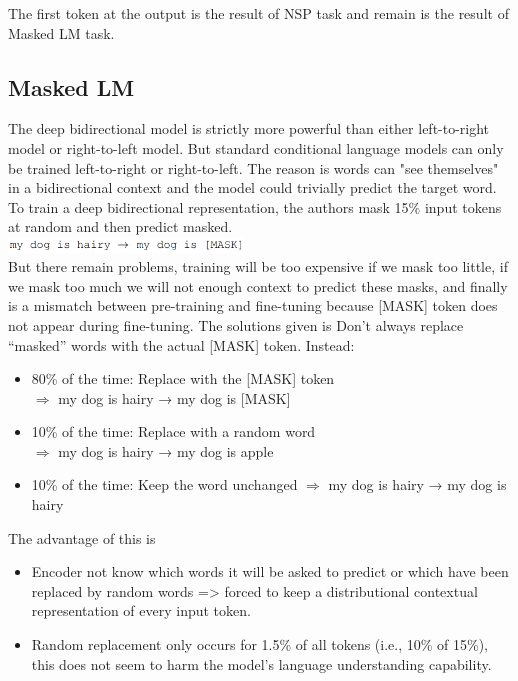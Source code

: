 \documentclass[11pt]{article}
\begin{document}
The first token at the output is the result of NSP task and remain is the result of Masked LM task.
\subsection{Masked LM}
\quad The deep bidirectional model is strictly more powerful than either left-to-right model or right-to-left model. But standard conditional language models can only be trained left-to-right or right-to-left. The reason is words can "see themselves" in a bidirectional context and the model could trivially predict the target word. To train a deep bidirectional representation, the authors mask 15$\%$ input tokens at random and then predict masked. \\

\includegraphics[width=0.47\textwidth]{MLM.png} \\

But there remain problems, training will be too expensive if we mask too little, if we mask too much we will not enough context to predict these masks, and finally is a mismatch between pre-training and fine-tuning because [MASK] token does not appear during fine-tuning. The solutions given is Don't always replace “masked” words with the actual [MASK] token. Instead: 
\begin{itemize}
 \item 80\% of the time: Replace with the [MASK] token\\
$\Rightarrow$ my dog is hairy → my dog is [MASK] 

 \item 10\% of the time: Replace with a random word\\
$\Rightarrow$ my dog is hairy → my dog is apple 

 \item 10\% of the time: Keep the word unchanged
$\Rightarrow$ my dog is hairy → my dog is hairy   
\end{itemize}

The advantage of this is
\begin{itemize}
    \item Encoder not know which words it will be asked to predict or which have been replaced by random words => forced to keep a distributional contextual representation of every input token.
    \item Random replacement only occurs for 1.5\% of all tokens (i.e., 10\% of 15\%), this does not seem to harm the model’s language understanding capability.
\end{itemize}
\end{document}
